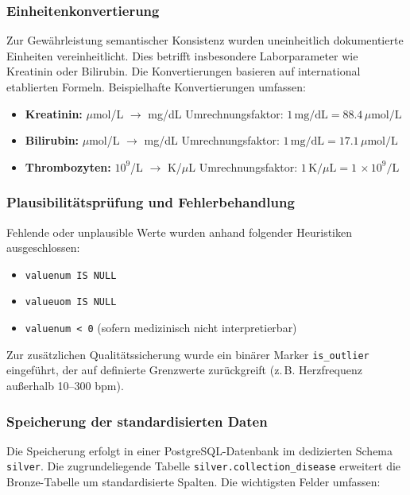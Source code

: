 \documentclass[12pt]{article}
\begin{document}
\subsubsection{Einheitenkonvertierung}

Zur Gewährleistung semantischer Konsistenz wurden uneinheitlich dokumentierte Einheiten vereinheitlicht. Dies betrifft insbesondere Laborparameter wie Kreatinin oder Bilirubin. Die Konvertierungen basieren auf international etablierten Formeln. Beispielhafte Konvertierungen umfassen:

\begin{itemize}
    \item \textbf{Kreatinin:} $\mu$mol/L $\rightarrow$ mg/dL \quad Umrechnungsfaktor: $1\,\text{mg/dL} = 88.4\,\mu\text{mol/L}$
    \item \textbf{Bilirubin:} $\mu$mol/L $\rightarrow$ mg/dL \quad Umrechnungsfaktor: $1\,\text{mg/dL} = 17.1\,\mu\text{mol/L}$
    \item \textbf{Thrombozyten:} $10^9$/L $\rightarrow$ K/$\mu$L \quad Umrechnungsfaktor: $1\,\text{K}/\mu\text{L} = 1\,\times 10^9/\text{L}$
\end{itemize}

\subsubsection{Plausibilitätsprüfung und Fehlerbehandlung}

Fehlende oder unplausible Werte wurden anhand folgender Heuristiken ausgeschlossen:

\begin{itemize}
    \item \texttt{valuenum IS NULL}
    \item \texttt{valueuom IS NULL}
    \item \texttt{valuenum < 0} (sofern medizinisch nicht interpretierbar)
\end{itemize}

Zur zusätzlichen Qualitätssicherung wurde ein binärer Marker \texttt{is\_outlier} eingeführt, der auf definierte Grenzwerte zurückgreift (z.\,B. Herzfrequenz außerhalb 10–300 bpm).

\subsubsection{Speicherung der standardisierten Daten}

Die Speicherung erfolgt in einer PostgreSQL-Datenbank im dedizierten Schema \texttt{silver}. Die zugrundeliegende Tabelle \texttt{silver.collection\_disease} erweitert die Bronze-Tabelle um standardisierte Spalten. Die wichtigsten Felder umfassen:
\end{document}
